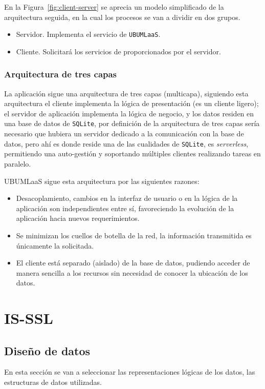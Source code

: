 En la Figura~\ref{fig:client-server} se aprecia un modelo simplificado de la arquitectura seguida, en la cual los procesos se van a dividir en dos grupos. 
\begin{itemize}
\item Servidor. Implementa el servicio de \texttt{UBUMLaaS}.
\item Cliente. Solicitará los servicios de proporcionados por el servidor.
\end{itemize}

\subsubsection{Arquitectura de tres capas}
La aplicación sigue una arquitectura de tres capas (multicapa), siguiendo esta arquitectura el cliente implementa la lógica de presentación (es un cliente ligero); el servidor de aplicación implementa la lógica de negocio, y los datos residen en una base de datos de \texttt{SQLite}, por definición de la arquitectura de tres capas sería necesario que hubiera un servidor dedicado a la comunicación con la base de datos, pero ahí es donde reside una de las cualidades de \texttt{SQLite}, es \textit{serverless}, permitiendo una auto-gestión y soportando múltiples clientes realizando tareas en paralelo.

UBUMLaaS sigue esta arquitectura por las siguientes razones:
\begin{itemize}
\item Desacoplamiento, cambios en la interfaz de usuario o en la lógica de la aplicación son independientes entre sí, favoreciendo la evolución de la aplicación hacia nuevos requerimientos.
\item Se minimizan los cuellos de botella de la red, la información transmitida es únicamente la solicitada.
\item El cliente está separado (aislado) de la base de datos, pudiendo acceder de manera sencilla a los recursos sin necesidad de conocer la ubicación de los datos.
\end{itemize}

\FloatBarrier
\section{IS-SSL}
\subsection{Diseño de datos}
En esta sección se van a seleccionar las representaciones lógicas de los datos, las estructuras de datos utilizadas.

